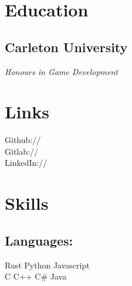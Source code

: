 \documentclass[]{deedy-resume-openfont}
\begin{document}
\vspace*{10pt}


%
%

\begin{minipage}[t]{0.33\textwidth}

\section{Education}

\subsection{Carleton University}
\textit{Honours in Game Development}
\sectionsep

\section{Links}

\sectionsep

Github:// \href{https://github.com/AngelOnFira}{}\\

Gitlab:// \href{https://gitlab.com/AngelOnFira}{}\\

LinkedIn://  \href{https://www.linkedin.com/in/forest-anderson}{}

\sectionsep

\section{Skills}

\subsection{Languages:}
\sectionsep

 Rust \textbullet{} Python \textbullet{} Javascript\\

 C \textbullet{} C++ \textbullet{} C\# \textbullet{} Java\\


\end{minipage}
\end{document}
